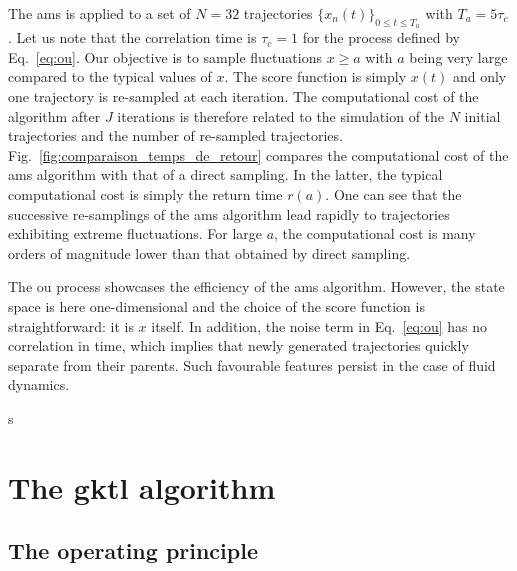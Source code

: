 \documentclass{jfm}
\newcommand{\EL}[1]{{\color{myred}{#1}}}
\begin{document}
	
	The \ac{ams} is applied  to a set of $N=32$ trajectories $\{x_n(t)\}_{0\leq t \leq T_a}$ with $T_a=5\tau_c$.
	Let us note that the correlation time is $\tau_c = 1$ for the process defined by Eq.~\eqref{eq:ou}.
	Our objective is to sample fluctuations $x\geq a$ with $a$ being very large compared to the typical values of $x$.
	The score function is simply $x(t)$ and only one trajectory is re-sampled at each iteration.
	The computational cost of the algorithm after $J$ iterations is therefore related to the simulation of the $N$ initial trajectories and the number of re-sampled trajectories.
	Fig.~\ref{fig:comparaison_temps_de_retour} compares the computational cost of the \ac{ams} algorithm with that of a direct sampling. 
	In the latter, the typical computational cost is simply the return time $r(a)$.
	One can see that the successive re-samplings of the \ac{ams} algorithm lead rapidly to trajectories exhibiting extreme fluctuations.
	For large $a$, the computational cost is many orders of magnitude lower than that obtained by direct sampling.
	
	The \acl{ou} process showcases the efficiency of the \ac{ams} algorithm.
	However, the state space is here one-dimensional and the choice of the score function is straightforward: it is $x$ itself.
	In addition, the noise term in Eq.~\eqref{eq:ou} has no correlation in time, which implies that newly generated trajectories quickly separate from their parents. Such favourable features \EL{do not} persist in the case of fluid dynamics.






s


\section{The \acl{gktl} algorithm}
\label{app:gktl_description}

\subsection{The operating principle}
\label{sec:gktl-operating-principle}
\end{document}
